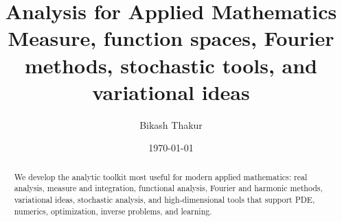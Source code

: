 \documentclass[11pt]{article}
\title{%
{\sffamily\huge\bfseries\color{DarkNavy} Analysis for Applied Mathematics}\\[6pt]
{\sffamily\large\color{AccentGray} Measure, function spaces, Fourier methods, stochastic tools, and variational ideas}
}
\author{{\sffamily Bikash Thakur}}
\date{{\sffamily\small\color{AccentGray} \today}}
\begin{document}

\pagecolor{OffWhite}
\color{DarkNavy}

\maketitle
\thispagestyle{plain}

\begin{abstract}
\noindent
We develop the analytic toolkit most useful for modern applied mathematics: real analysis, measure and integration, functional analysis, Fourier and harmonic methods, variational ideas, stochastic analysis, and high-dimensional tools that support PDE, numerics, optimization, inverse problems, and learning.
\end{abstract}

\tableofcontents
\newpage



\printindex
\end{document}
